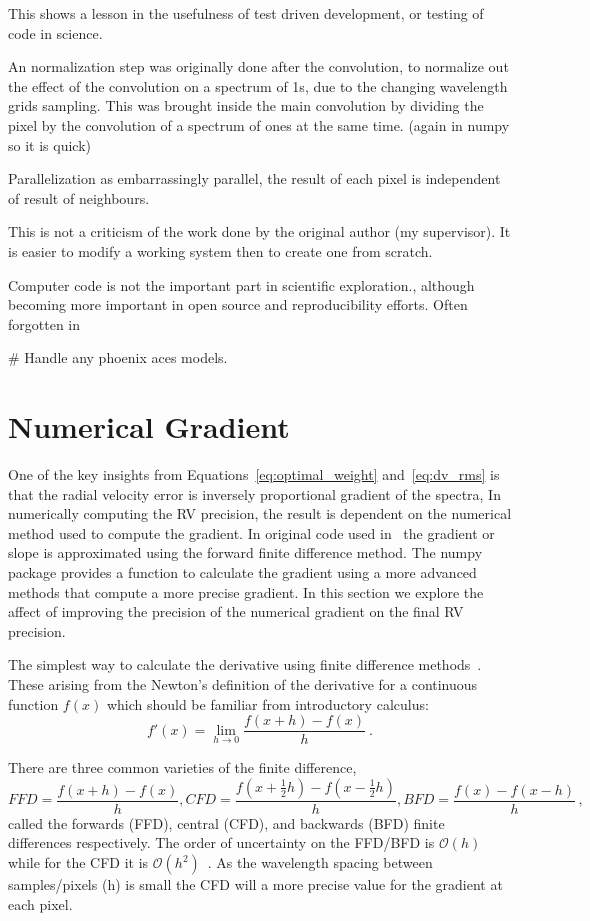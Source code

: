 This shows a lesson in the usefulness of test driven development, or testing of code in science.


An normalization step was originally done after the convolution, to normalize out the effect of the convolution on a spectrum of 1s, due to the changing wavelength grids sampling. This was brought inside the main convolution by dividing the pixel by the convolution of a spectrum of ones at the same time. (again in numpy so it is quick)

Parallelization as embarrassingly parallel, the result of each pixel is independent of result of neighbours.

This is not a criticism of the work done by the original author (my supervisor). It is easier to modify a working system then to create one from scratch.

Computer code is not the important part in scientific exploration., although becoming more important in open source and reproducibility efforts. Often forgotten in

\# Handle any phoenix aces models.


\section{Numerical Gradient}
\label{sec:numerical_gradient}
One of the key insights from Equations~\ref{eq:optimal_weight} and~\ref{eq:dv_rms} is that the radial velocity error is inversely proportional gradient of the spectra, In numerically computing the RV precision, the result is dependent on the numerical method used to compute the gradient.
In original code used in~\citet{figueira_radial_2016} the gradient or slope is approximated using the forward finite difference method. The numpy package provides a function to calculate the gradient using a more advanced methods that compute a more precise gradient. In this section we explore the affect of improving the precision of the numerical gradient on the final RV precision.

The simplest way to calculate the derivative using finite difference methods~\citep{quarteroni_numerical_2000}. These arising from the Newton's definition of the derivative for a continuous function \(f(x)\) which should be familiar from introductory calculus:
\[f'(x) = \lim_{h \to 0} \frac{f(x+h)-f(x)}{h}~.\]

There are three common varieties of the finite difference,
 \[FFD = \frac{f(x+h)-f(x)}{h},  CFD=\frac{f(x+\frac{1}{2}h)-f(x-\frac{1}{2}h)}{h}, BFD=\frac{f(x)-f(x-h)}{h}\,,\] called the forwards (FFD), central (CFD), and backwards (BFD) finite differences respectively. The order of uncertainty on the FFD/BFD is \(\mathcal{O}(h)\) while for the CFD it is \(\mathcal{O}(h^2)\)~\citep{quarteroni_numerical_2000}. As the wavelength spacing between samples/pixels (h) is small the CFD will a more precise value for the gradient at each pixel.

